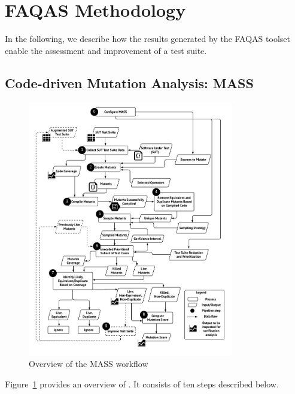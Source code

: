 
\section{FAQAS Methodology}
\label{sec:methodology}

\STARTCHANGEDWPT

In the following, we describe how the results generated by the FAQAS toolset enable the assessment and improvement of a test suite.


\subsection{Code-driven Mutation Analysis: MASS}
\label{sec:meth:mass}


\begin{figure}[tb]
\begin{center}
\includegraphics[width=0.8\textwidth]{images/MASS-extended.pdf}
\caption{Overview of the MASS workflow}
\label{fig:MASS}
\end{center}
\end{figure}

Figure~\ref{fig:MASS} provides an overview of \MASS. It consists of ten steps described below.

